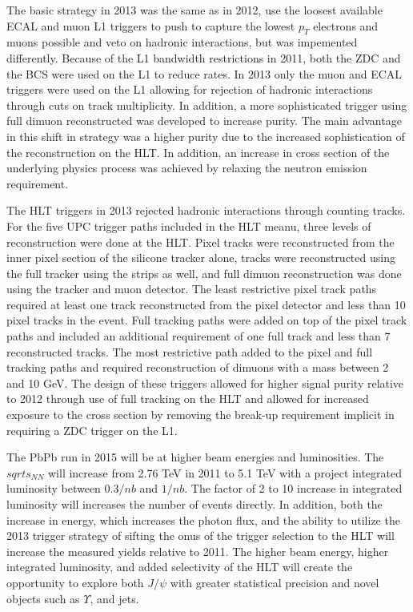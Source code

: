     The basic strategy in 2013 was the same as in 2012, use the loosest 
      available ECAL and muon L1 triggers to push to capture the lowest $p_{T}$
      electrons and muons possible and veto on hadronic interactions,
      but was impemented differently.
    Because of the L1 bandwidth restrictions in 2011, both the ZDC and the BCS 
      were used on the L1 to reduce rates.
    In 2013 only the muon and ECAL triggers were used on the L1 allowing for 
      rejection of hadronic interactions through cuts on track multiplicity. 
    In addition, a more sophisticated trigger using full dimuon reconstructed 
      was developed to increase purity.
    The main advantage in this shift in strategy was a higher purity due to 
      the increased sophistication of the reconstruction on the HLT.
    In addition, an increase in cross section of the underlying physics process
      was achieved by relaxing the neutron emission requirement.

    The HLT triggers in 2013 rejected hadronic interactions through counting
      tracks. 
    For the five UPC trigger paths included in the HLT meanu, 
      three levels of reconstruction were done at the HLT. 
    Pixel tracks were reconstructed from the inner pixel section of the 
      silicone tracker alone, tracks were reconstructed using the full
      tracker using the strips as well, and full dimuon reconstruction was 
      done using the tracker and muon detector. 
    The least restrictive pixel track paths required at least 
      one track reconstructed from the pixel detector and less than 10 pixel 
      tracks in the event.
    Full tracking paths were added on top of the pixel track paths and included
      an additional requirement of one full track and less than 7 reconstructed
      tracks.
    The most restrictive path added to the pixel and full tracking paths and 
      required reconstruction of dimuons with a mass between 2 and 10 GeV.
    The design of these triggers allowed for higher signal purity relative to 
      2012 through use of full tracking on the HLT and allowed for increased
      exposure to the cross section by removing the break-up requirement 
      implicit in requiring a ZDC trigger on the L1.

    The PbPb run in 2015 will be at higher beam energies and luminosities.
    The $sqrt{s_{NN}}$ will increase from 2.76 TeV in 2011 to 5.1 TeV with
      a project integrated luminosity between $0.3/nb$ and $1/nb$. 
    The factor of 2 to 10 increase in integrated luminosity will increases the 
      number of events directly.
    In addition, both the increase in energy, which increases the photon flux,
      and the ability to utilize the 2013 trigger strategy of sifting the 
      onus of the trigger selection to the HLT will increase the measured 
      yields relative to 2011.
    The higher beam energy, higher integrated luminosity, and added selectivity
      of the HLT will create the opportunity to explore both $J/\psi$ with 
      greater statistical precision and novel objects such as $\Upsilon$, and 
      jets. 

